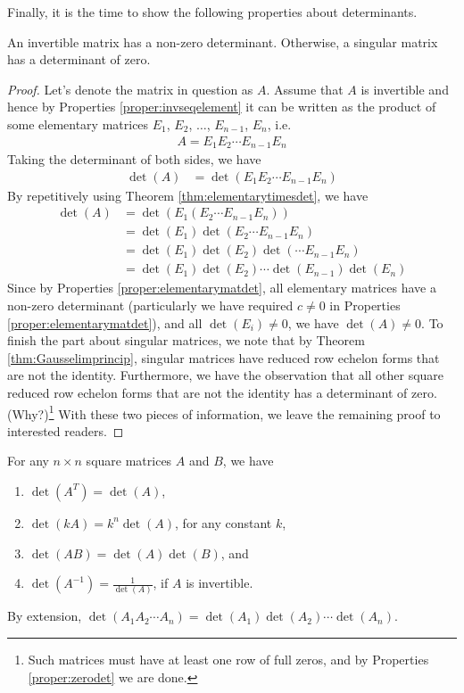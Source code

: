 Finally, it is the time to show the following properties about determinants.
\begin{proper}
\label{proper:invnonzerodet}
An invertible matrix has a non-zero determinant. Otherwise, a singular matrix has a determinant of zero.
\end{proper}
\begin{proof}
Let's denote the matrix in question as $A$. Assume that $A$ is invertible and hence by Properties \ref{proper:invseqelement} it can be written as the product of some elementary matrices $E_1$, $E_2$, $\ldots$, $E_{n-1}$, $E_n$, i.e.
\begin{align*}
A = E_{1}E_{2} \cdots E_{n-1}E_n
\end{align*}
Taking the determinant of both sides, we have
\begin{align*}
\det(A) &= \det(E_{1}E_{2} \cdots E_{n-1}E_n)
\end{align*}
By repetitively using Theorem \ref{thm:elementarytimesdet}, we have
\begin{align*}
\det(A) &= \det(E_{1}(E_{2} \cdots E_{n-1}E_n)) \\
&= \det(E_1) \det(E_{2} \cdots E_{n-1}E_n) \\
&= \det(E_1) \det(E_{2}) \det(\cdots E_{n-1}E_n) \\
&= \det(E_1) \det(E_{2}) \cdots \det(E_{n-1})\det(E_n)
\end{align*}
Since by Properties \ref{proper:elementarymatdet}, all elementary matrices have a non-zero determinant (particularly we have required $c \neq 0$ in Properties \ref{proper:elementarymatdet}), and all $\det(E_i) \neq 0$, we have $\det(A) \neq 0$. To finish the part about singular matrices, we note that by Theorem \ref{thm:Gausselimprincip}, singular matrices have reduced row echelon forms that are not the identity. Furthermore, we have the observation that all other square reduced row echelon forms that are not the identity has a determinant of zero. (Why?)\footnote{Such matrices must have at least one row of full zeros, and by Properties \ref{proper:zerodet} we are done.} With these two pieces of information, we leave the remaining proof to interested readers.
\end{proof}
\begin{proper}
\label{proper:properdet}
For any $n \times n$ square matrices $A$ and $B$, we have
\begin{enumerate}
\item $\det(A^T) = \det(A)$,
\item $\det(kA) = k^n \det(A)$, for any constant $k$,
\item $\det(AB) = \det(A)\det(B)$, and
\item $\det(A^{-1}) = \frac{1}{\det(A)}$, if $A$ is invertible.
\end{enumerate}
By extension, $\det(A_1A_2\cdots A_n) = \det(A_1)\det(A_2)\cdots\det(A_n)$.
\end{proper}
